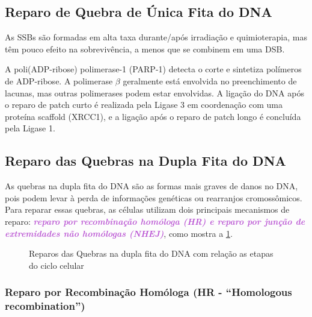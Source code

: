 \documentclass[11pt,a4paper]{article}
\begin{document}
\subsection*{Reparo de Quebra de Única Fita do DNA}

	As SSBs são formadas em alta taxa durante/após irradiação e quimioterapia, mas têm pouco efeito na sobrevivência, a menos que se combinem em uma DSB. 

	A poli(ADP-ribose) polimerase-1 (PARP-1) detecta o corte e sintetiza polímeros de ADP-ribose. A polimerase $\beta$ geralmente está envolvida no preenchimento de lacunas, mas outras polimerases podem estar envolvidas. A ligação do DNA após o reparo de patch curto é realizada pela Ligase 3 em coordenação com uma proteína scaffold (XRCC1), e a ligação após o reparo de patch longo é concluída pela Ligase 1.


\subsection*{Reparo das Quebras na Dupla Fita do DNA}

	As quebras na dupla fita do DNA são as formas mais graves de danos no DNA, pois podem levar à perda de informações genéticas ou rearranjos cromossômicos. Para reparar essas quebras, as células utilizam dois principais mecanismos de reparo: \textcolor{MediumOrchid}{\textbf{\textit{reparo por recombinação homóloga (HR) e reparo por junção de extremidades não homólogas (NHEJ)}}}, como mostra a \ref{fig:reparoQuebraDupla}. 

	\begin{figure}
		\centering
		\caption{Reparos das Quebras na dupla fita do DNA com relação as etapas do ciclo celular}
		\label{fig:reparoQuebraDupla}
	\end{figure}

\subsubsection*{Reparo por Recombinação Homóloga (HR - ``Homologous recombination'')}
\end{document}
